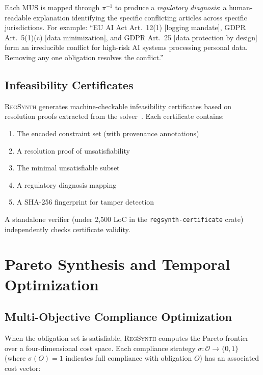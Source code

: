 \documentclass[11pt,twocolumn]{article}
\newcommand{\regsynth}{\textsc{RegSynth}}
\begin{document}
Each MUS is mapped through $\pi^{-1}$ to produce a \emph{regulatory diagnosis}:
a human-readable explanation identifying the specific conflicting articles across
specific jurisdictions. For example: ``EU AI Act Art.~12(1) [logging mandate],
GDPR Art.~5(1)(c) [data minimization], and GDPR Art.~25 [data protection by
design] form an irreducible conflict for high-risk AI systems processing personal
data. Removing any one obligation resolves the conflict.''

\subsection{Infeasibility Certificates}

\regsynth{} generates machine-checkable infeasibility certificates based on
resolution proofs extracted from the solver~\cite{necula1997pcc}. Each certificate
contains:
\begin{enumerate}[nosep,leftmargin=*]
  \item The encoded constraint set (with provenance annotations)
  \item A resolution proof of unsatisfiability
  \item The minimal unsatisfiable subset
  \item A regulatory diagnosis mapping
  \item A SHA-256 fingerprint for tamper detection
\end{enumerate}

A standalone verifier (under 2{,}500 LoC in the \texttt{regsynth-certificate}
crate) independently checks certificate validity.

\section{Pareto Synthesis and Temporal Optimization}
\label{sec:pareto}

\subsection{Multi-Objective Compliance Optimization}

When the obligation set is satisfiable, \regsynth{} computes the Pareto frontier
over a four-dimensional cost space. Each compliance strategy
$\sigma : \mathcal{O} \to \{0, 1\}$ (where $\sigma(O) = 1$ indicates full
compliance with obligation $O$) has an associated cost vector:
\end{document}
